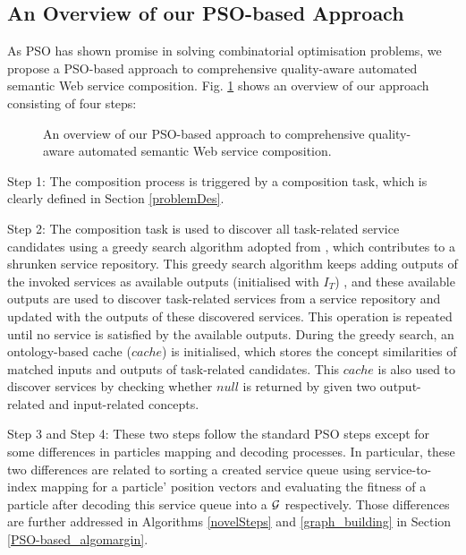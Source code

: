 \subsection{An Overview of our PSO-based Approach}\label{PSO_based_approach}
As PSO has shown promise in solving combinatorial optimisation problems, we propose a PSO-based approach to comprehensive quality-aware automated semantic Web service composition. Fig. \ref{overview} shows an overview of our approach consisting of four steps: 
\begin{figure}[h]
\centering
{}
 \caption{An overview of our PSO-based approach to comprehensive quality-aware automated semantic Web service composition.}
 \label{overview}
\end{figure}

Step 1: The composition process is triggered by a composition task, which is clearly defined in Section \ref{problemDes}. 

Step 2: The composition task is used to discover all task-related service candidates using a greedy search algorithm adopted from \cite{ma2015hybrid}, which contributes to a shrunken service repository. This greedy search algorithm keeps adding outputs of the invoked services as available outputs (initialised with $I_{T}$) , and these available outputs are used to discover task-related services from a service repository and updated with the outputs of these discovered services. This operation is repeated until no service is satisfied by the available outputs. During the greedy search, an ontology-based cache ($cache$) is initialised, which stores the concept similarities of matched inputs and outputs of task-related candidates. This $cache$ is also used to discover services by checking whether $null$ is returned by given two output-related and input-related concepts.

Step 3 and Step 4: These two steps follow the standard PSO steps \cite{shi2001particle} except for some differences in particles mapping and decoding processes. In particular, these two differences are related to sorting a created service queue using service-to-index mapping for a particle' position vectors and evaluating the fitness of a particle after decoding this service queue into a $\mathcal{G}$ respectively. Those differences are further addressed in Algorithms \ref{novelSteps} and \ref{graph_building} in Section \ref{PSO-based_algomargin}.
